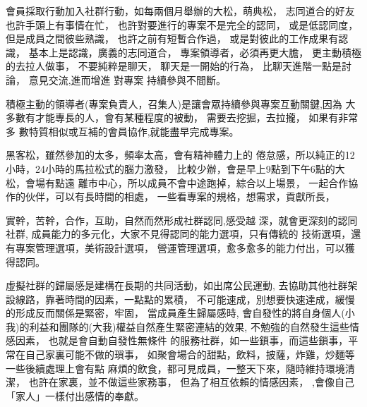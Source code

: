 會員採取行動加入社群行動，如每兩個月舉辦的大松，萌典松，
志同道合的好友
也許手頭上有事情在忙，
也許對要進行的專案不是完全的認同，
或是低認同度，
但是成員之間彼些熟識，
也許之前有短暫合作過，
或是對彼此的工作成果有認識，
基本上是認識，廣義的志同道合，
專案領導者，必須再更大膽，
更主動積極的去拉人做事，
不要純粹是聊天，
聊天是一開始的行為，
比聊天進階一點是討論，
意見交流,進而增進
對專案
持續參與不間斷。

積極主動的領導者(專案負責人，召集人)是讓會眾持續參與專案互動關鍵,因為
大多數有才能專長的人，會有某種程度的被動，
需要去挖掘，去拉攏，
如果有非常多
數特質相似或互補的會員協作,就能盡早完成專案。






黑客松，雖然參加的太多，頻率太高，會有精神體力上的
倦怠感，所以純正的12小時，24小時的馬拉松式的腦力激發，
比較少辦，會是早上9點到下午6點的大松，會場有點遠
離市中心，所以成員不會中途跑掉，綜合以上場景，
一起合作協作的伙伴，可以有長時間的相處，
一些看專案的規格，想需求，貢獻所長，

實幹，苦幹，合作，互助，自然而然形成社群認同,感受越
深，就會更深刻的認同社群,
成員能力的多元化，大家不見得認同的能力選項，只有傳統的
技術選項，還有專案管理選項，美術設計選項，
營運管理選項，愈多愈多的能力付出，可以獲得認同。




虛擬社群的歸屬感是建構在長期的共同活動，如出席公民運動,
去協助其他社群架設線路，靠著時間的因素，一點點的累積，
不可能速成，別想要快速達成，緩慢的形成反而關係是緊密，牢固，
當成員產生歸屬感時,
會自發性的將自身個人(小我)的利益和團隊的(大我)權益自然產生緊密連結的效果,
不勉強的自然發生這些情感因素，
也就是會自動自發性無條件
的服務社群，如一些鎖事，而這些鎖事，平常在自己家裏可能不做的瑣事，
如聚會場合的甜點，飲料，披薩，炸雞，炒麵等一些後續處理上會有點
麻煩的飲食，都可見成員，一整天下來，隨時維持環境清潔，
也許在家裏，並不做這些家務事，
但為了相互依賴的情感因素，
,會像自己「家人」一樣付出感情的奉獻。




\EndChapter



